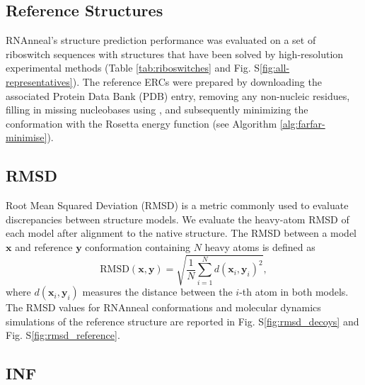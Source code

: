 \documentclass[%
aip,
 amsmath,amssymb,
reprint,%
twocolumn,
]{revtex4-1}
\makeatletter
\newcommand\setcurrentname[1]{\def\@currentlabelname{#1}}
\makeatother
\begin{document}
{\subsection*{Reference Structures}
\setcurrentname{Reference Structures}
\label{methods:preparation}

RNAnneal's structure prediction performance was evaluated on a set of riboswitch sequences with structures that have been solved by high-resolution experimental methods (Table \ref{tab:riboswitches} and Fig. S\ref{fig:all-representatives}). The reference ERCs were prepared by downloading the associated Protein Data Bank (PDB) entry, removing any non-nucleic residues, filling in missing nucleobases using , and subsequently minimizing the conformation with the Rosetta energy function (see Algorithm \ref{alg:farfar-minimise}).

\subsection*{RMSD}
\setcurrentname{RMSD}
\label{methods:rmsd}

Root Mean Squared Deviation (RMSD) is a metric commonly used to evaluate discrepancies between structure models. We evaluate the heavy-atom RMSD of each model after alignment to the native structure. The RMSD between a model $\mathbf{x}$ and reference $\mathbf{y}$ conformation containing $N$ heavy atoms is defined as
\begin{equation}
    \mathrm{RMSD}(\mathbf{x}, \mathbf{y}) = \sqrt{\frac{1}{N}\sum_{i=1}^N d(\mathbf{x}_i, \mathbf{y}_i)^2},
\end{equation}
where $d(\mathbf{x}_i, \mathbf{y}_i)$ measures the distance between the $i$-th atom in both models. The RMSD values for RNAnneal conformations and molecular dynamics simulations of the reference structure are reported in Fig. S\ref{fig:rmsd_decoys} and Fig. S\ref{fig:rmsd_reference}. 

\subsection*{INF}
       \setcurrentname{INF}
\label{methods:inf}

}
\end{document}
